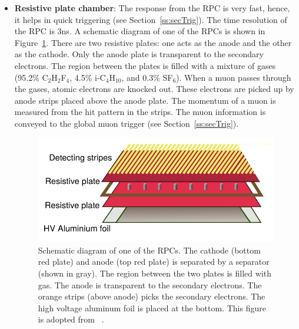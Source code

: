 \begin{itemize}[leftmargin=*]
\item \textbf{Resistive plate chamber}: The response from the RPC is very
	fast, hence, it helps in quick triggering (see Section~\ref{ss:secTrig}).
	The time resolution of the RPC is 3\unit{ns}.
	A schematic diagram of one of the RPCs is shown in Figure~\ref{fig:cms_rpc}.
	There are two resistive plates: one acts as the anode and the other as the cathode.
	Only the anode plate is transparent to the secondary electrons.
	The region between the plates is filled with a mixture of gases (95.2\% 
	C$_2$H$_2$F$_4$, 4.5\% i-C$_4$H$_{10}$,	and 0.3\% SF$_6$). When a muon 
	passes through the gases, atomic electrons are knocked out. These electrons are 
	picked up by anode strips placed above the anode plate. The momentum of a 
	muon is measured from the hit pattern in the strips. The muon information is 
	conveyed to the global muon trigger (see Section~\ref{ss:secTrig}). 
\begin{figure}
\centering
\includegraphics[width=0.65\linewidth]{Experiment/CMS/Image/RPC.pdf}
\caption{Schematic diagram of one of the RPCs. The cathode (bottom red plate) and 
	anode (top red plate) is separated by a separator (shown in gray). The
	region between the two plates is filled with gas. The anode is
	transparent to the secondary electrons. The orange strips (above anode)
	picks the secondary electrons. The high voltage aluminum foil is placed
	at the bottom. This figure is adopted from ~\cite{Collaboration_2008_CMS}.}
\label{fig:cms_rpc}
\end{figure}
\end{itemize}

